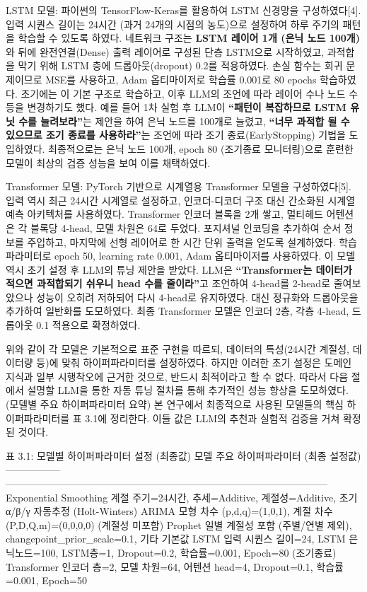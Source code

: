 \documentclass[12pt,ko,a4,]{report}
\begin{document}
LSTM 모델: 파이썬의 TensorFlow-Keras를 활용하여 LSTM 신경망을
구성하였다{[}4{]}. 입력 시퀀스 길이는 24시간 (과거 24개의 시점의
농도)으로 설정하여 하루 주기의 패턴을 학습할 수 있도록 하였다. 네트워크
구조는 \textbf{LSTM 레이어 1개 (은닉 노드 100개)}와 뒤에 완전연결(Dense)
출력 레이어로 구성된 단층 LSTM으로 시작하였고, 과적합을 막기 위해 LSTM
층에 드롭아웃(dropout) 0.2를 적용하였다. 손실 함수는 회귀 문제이므로
MSE를 사용하고, Adam 옵티마이저로 학습률 0.001로 80 epochs 학습하였다.
초기에는 이 기본 구조로 학습하고, 이후 LLM의 조언에 따라 레이어 수나
노드 수 등을 변경하기도 했다. 예를 들어 1차 실험 후 LLM이
\textbf{``패턴이 복잡하므로 LSTM 유닛 수를 늘려보라''}는 제안을 하여
은닉 노드를 100개로 늘렸고, \textbf{``너무 과적합 될 수 있으므로 조기
종료를 사용하라''}는 조언에 따라 조기 종료(EarlyStopping) 기법을
도입하였다. 최종적으로는 은닉 노드 100개, epoch 80 (조기종료
모니터링)으로 훈련한 모델이 최상의 검증 성능을 보여 이를 채택하였다.

Transformer 모델: PyTorch 기반으로 시계열용 Transformer 모델을
구성하였다{[}5{]}. 입력 역시 최근 24시간 시계열로 설정하고,
인코더-디코더 구조 대신 간소화된 시계열 예측 아키텍처를 사용하였다.
Transformer 인코더 블록을 2개 쌓고, 멀티헤드 어텐션은 각 블록당 4-head,
모델 차원은 64로 두었다. 포지셔널 인코딩을 추가하여 순서 정보를
주입하고, 마지막에 선형 레이어로 한 시간 단위 출력을 얻도록 설계하였다.
학습 파라미터로 epoch 50, learning rate 0.001, Adam 옵티마이저를
사용하였다. 이 모델 역시 초기 설정 후 LLM의 튜닝 제안을 받았다. LLM은
\textbf{``Transformer는 데이터가 적으면 과적합되기 쉬우니 head 수를
줄이라''}고 조언하여 4-head를 2-head로 줄여보았으나 성능이 오히려
저하되어 다시 4-head로 유지하였다. 대신 정규화와 드롭아웃을 추가하여
일반화를 도모하였다. 최종 Transformer 모델은 인코더 2층, 각층 4-head,
드롭아웃 0.1 적용으로 확정하였다.

위와 같이 각 모델은 기본적으로 표준 구현을 따르되, 데이터의 특성(24시간
계절성, 데이터량 등)에 맞춰 하이퍼파라미터를 설정하였다. 하지만 이러한
초기 설정은 도메인 지식과 일부 시행착오에 근거한 것으로, 반드시
최적이라고 할 수 없다. 따라서 다음 절에서 설명할 LLM을 통한 자동 튜닝
절차를 통해 추가적인 성능 향상을 도모하였다. (모델별 주요 하이퍼파라미터
요약) 본 연구에서 최종적으로 사용된 모델들의 핵심 하이퍼파라미터를 표
3.1에 정리한다. 이들 값은 LLM의 추천과 실험적 검증을 거쳐 확정된 것이다.

표 3.1: 모델별 하이퍼파라미터 설정 (최종값) \textbar{} 모델 \textbar{}
주요 하이퍼파라미터 (최종 설정값) \textbar{}
\textbar-----------------\textbar--------------------------------------------------------------------------------------------------\textbar{}
\textbar{} Exponential Smoothing \textbar{} 계절 주기=24시간,
추세=Additive, 계절성=Additive, 초기 α/β/γ 자동추정 (Holt-Winters)
\textbar{} \textbar{} ARIMA \textbar{} 모형 차수 (p,d,q)=(1,0,1), 계절
차수 (P,D,Q,m)=(0,0,0,0) (계절성 미포함) \textbar{} \textbar{} Prophet
\textbar{} 일별 계절성 포함 (주별/연별 제외),
changepoint\_prior\_scale=0.1, 기타 기본값 \textbar{} \textbar{} LSTM
\textbar{} 입력 시퀀스 길이=24, LSTM 은닉노드=100, LSTM층=1,
Dropout=0.2, 학습률=0.001, Epoch=80 (조기종료) \textbar{} \textbar{}
Transformer \textbar{} 인코더 층=2, 모델 차원=64, 어텐션 head=4,
Dropout=0.1, 학습률=0.001, Epoch=50 \textbar{}
\end{document}
